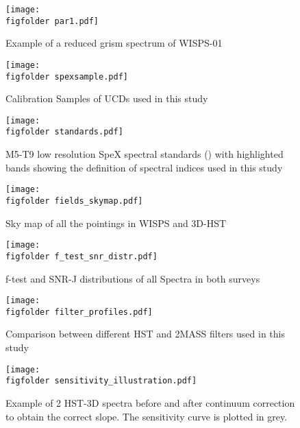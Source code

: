 \newcommand{\figfolder}{/users/caganze/research/wisps/figures/}


\begin{figure*}
   \centering
   \texttt{[image: \\figfolder par1.pdf]}
   \caption{Example of a reduced grism spectrum of WISPS-01}
   \label{fig:spexsample}
\end{figure*}


\begin{figure*}
   \centering
   \texttt{[image: \\figfolder spexsample.pdf]}
   \caption{Calibration Samples of UCDs used in this study}
   \label{fig:spexsample}
\end{figure*}


\begin{figure*}
    \centering
    \texttt{[image: \\figfolder standards.pdf]}
    \caption{M5-T9 low resolution SpeX spectral standards (\citealt{2010ApJS..190..100K}) with highlighted bands showing the definition of spectral indices used in this study}
    \label{fig:indexdefinition}
\end{figure*}



\begin{figure*}
    \centering
    \texttt{[image: \\figfolder fields\_skymap.pdf]}
    \caption{Sky map of all the pointings in WISPS and 3D-HST}
    \label{fig:skymap}
\end{figure*}

\begin{figure*}
    \centering
    \texttt{[image: \\figfolder f\_test\_snr\_distr.pdf]}
    \caption{f-test and SNR-J distributions of all Spectra in both surveys}
    \label{fig:skymap}
\end{figure*}



\begin{figure*}
    \centering
    \texttt{[image: \\figfolder filter\_profiles.pdf]}
    \caption{Comparison between different HST and 2MASS filters used in this study}
    \label{fig:filterprofiles}
\end{figure*}



\begin{figure*}
\centering
\texttt{[image: \\figfolder sensitivity\_illustration.pdf]}
\caption{ Example of 2 HST-3D spectra before and after continuum correction to obtain the correct slope. The sensitivity curve is plotted in grey.}
\label{fig:sensitivity}
\end{figure*}

